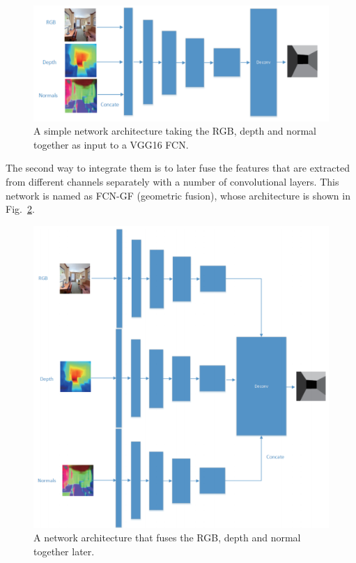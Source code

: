 \begin{figure}
	\centering
	\includegraphics[width=\columnwidth]{figure/fcn-multi-channel.png}
	\caption{A simple network architecture taking the RGB, depth and normal together as input to a VGG16 FCN. }
	\label{fig:fcn-multi-channel}
\end{figure}

The second way to integrate them is to later fuse the features that are extracted from different channels separately with a number of convolutional layers. 
This network is named as FCN-GF (geometric fusion), whose architecture is shown in Fig.~\ref{fig:fcn-geometric-fusion}.
  
\begin{figure}
	\centering
	\includegraphics[width=\columnwidth]{figure/fcn-geometric-fusion.png}
	\caption{A network architecture that fuses the RGB, depth and normal together later. }
	\label{fig:fcn-geometric-fusion}
\end{figure}


